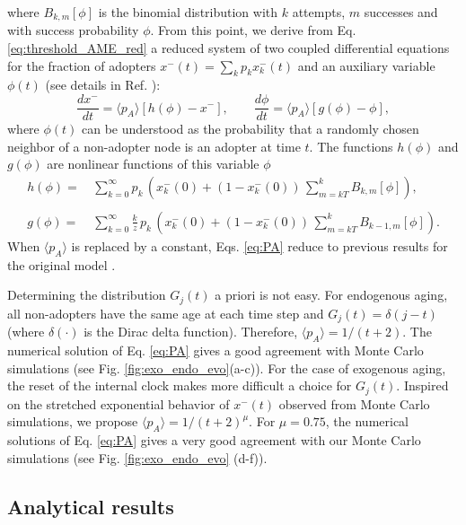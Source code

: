 where $B_{k,m}[\phi]$ is the binomial distribution with $k$ attempts, $m$ successes and with success probability $\phi$. From this point, we derive from Eq. \eqref{eq:threshold_AME_red} a reduced system of two coupled differential equations for the fraction of adopters $x^{-}(t) = \sum_k p_k x^{-}_{k} (t)$ and an auxiliary variable $\phi (t)$ (see details in Ref. \cite{gleeson-2013}):
\begin{equation}
    \label{eq:PA}
        \frac{d x^{-}}{dt} = \langle p_A \rangle [ h(\phi) - x^{-} ], \quad \quad \frac{d \phi}{dt} = \langle p_A \rangle [ g(\phi) - \phi ],
\end{equation}
where $\phi(t)$ can be understood as the probability that a randomly chosen neighbor of a non-adopter node is an adopter at time $t$. The functions $h(\phi)$ and $g(\phi)$ are nonlinear functions of this variable $\phi$
\begin{align}
    h (\phi)  = & \,  \sum_{k=0}^{\infty} p_k\,  \left( x^{-}_{k} (0) + (1 - x^{-}_{k} (0))\,  \sum_{m = kT}^{k} B_{k,m}[\phi]\right),\nonumber\\
    \\
    g (\phi)  = & \, \sum_{k=0}^{\infty} \frac{k}{z}\,  p_k \,  \left( x^{-}_{k} (0) + (1 - x^{-}_{k} (0)) \, \sum_{m = kT}^{k} B_{k-1,m}[\phi]\right). \nonumber
\end{align}
 When $\langle p_A \rangle$ is replaced by a constant, Eqs. \eqref{eq:PA} reduce to previous results for the original model \cite{gleeson-2008}.
 
Determining the distribution $G_j (t)$ a priori is not easy. For endogenous aging, all non-adopters have the same age at each time step and $G_j (t) = \delta(j-t)$ (where $\delta(\cdot)$ is the Dirac delta function). Therefore, $\langle p_A \rangle = 1/(t+2)$. The numerical solution of Eq. \eqref{eq:PA} gives a good agreement with Monte Carlo simulations (see Fig. \ref{fig:exo_endo_evo}(a-c)). For the case of exogenous aging, the reset of the internal clock makes more difficult a choice for $G_j (t)$.  Inspired on the stretched exponential behavior of $x^{-}(t)$ observed from Monte Carlo simulations, we propose $\langle p_A \rangle = 1/(t+2)^\mu$. For $\mu = 0.75$, the numerical solutions of Eq. \eqref{eq:PA} gives a very good agreement with our Monte Carlo simulations (see Fig. \ref{fig:exo_endo_evo} (d-f)).

\subsection{\label{subsec Analytical results} Analytical results}


